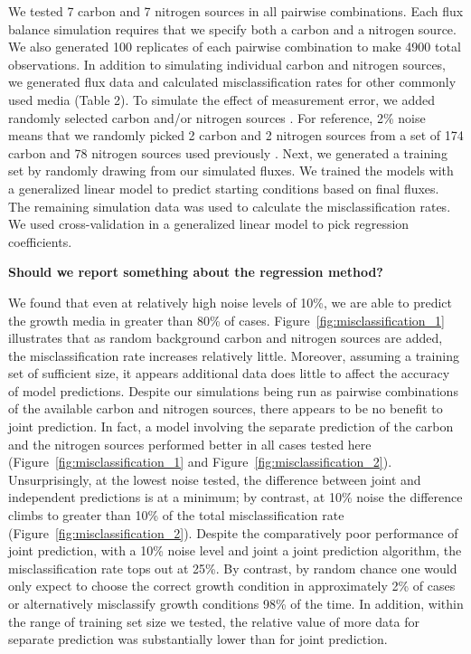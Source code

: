 \documentclass[12pt]{article}
\begin{document}
We tested 7 carbon and 7 nitrogen sources in all pairwise combinations. Each flux balance simulation requires that we specify both a carbon and a nitrogen source. We also generated 100 replicates of each pairwise combination to make 4900 total observations. In addition to simulating individual carbon and nitrogen sources, we generated flux data and calculated misclassification rates for other commonly used media (Table 2). To simulate the effect of measurement error, we added randomly selected carbon and/or nitrogen sources \cite{Feistetal2007}. For reference, 2\% noise means that we randomly picked 2 carbon and 2 nitrogen sources from a set of 174 carbon and 78 nitrogen sources used previously \cite{Feistetal2007}. Next, we generated a training set by randomly drawing from our simulated fluxes. We trained the models with a generalized linear model to predict starting conditions based on final fluxes. The remaining simulation data was used to calculate the misclassification rates. We used cross-validation in a generalized linear model to pick regression coefficients. 

\textbf{Should we report something about the regression method?}

We found that even at relatively high noise levels of 10\%, we are able to predict the growth media in greater than 80\% of cases. Figure~\ref{fig:misclassification_1} illustrates that as random background carbon and nitrogen sources are added, the misclassification rate increases relatively little. Moreover, assuming a training set of sufficient size, it appears additional data does little to affect the accuracy of model predictions. Despite our simulations being run as pairwise combinations of the available carbon and nitrogen sources, there appears to be no benefit to joint prediction. In fact, a model involving the separate prediction of the carbon and the nitrogen sources performed better in all cases tested here (Figure~\ref{fig:misclassification_1} and Figure~\ref{fig:misclassification_2}). Unsurprisingly, at the lowest noise tested, the difference between joint and independent predictions is at a minimum; by contrast, at 10\% noise the difference climbs to greater than 10\% of the total misclassification rate (Figure~\ref{fig:misclassification_2}). Despite the comparatively poor performance of joint prediction, with a 10\% noise level and joint a joint prediction algorithm, the misclassification rate tops out at 25\%. By contrast, by random chance one would only expect to choose the correct growth condition in approximately 2\% of cases or alternatively misclassify growth conditions 98\% of the time. In addition, within the range of training set size we tested, the relative value of more data for separate prediction was substantially lower than for joint prediction.
\end{document}
